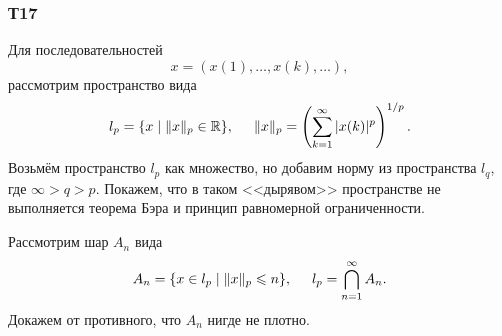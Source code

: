 \subsubsection*{Т17}

Для последовательностей 
\begin{equation*}
    x = (x(1), \ldots, x(k), \ldots),
\end{equation*}
рассмотрим пространство вида
\begin{equation*}
    l_p = \{x \mid \|x\|_p \in \mathbb{R} \},
    \hspace{5 mm} 
    \|x\|_p = \l(
        \sum_{k=1}^{\infty} |x(k)|^p
    \r)^{1/p}.
\end{equation*}
Возьмём пространство $l_p$ как множество, но добавим норму из пространства $l_q$, где $\infty > q > p$. Покажем, что в таком <<дырявом>> пространстве не выполняется теорема Бэра и принцип равномерной ограниченности. 

Рассмотрим шар $A_n$ вида
\begin{equation*}
    A_n = \{x \in l_p \mid \|x\|_p \leq n\},
    \hspace{5 mm}
    l_p = \bigcap_{n=1}^{\infty} A_n.
\end{equation*}
Докажем от противного, что $A_n$ нигде не плотно. 

